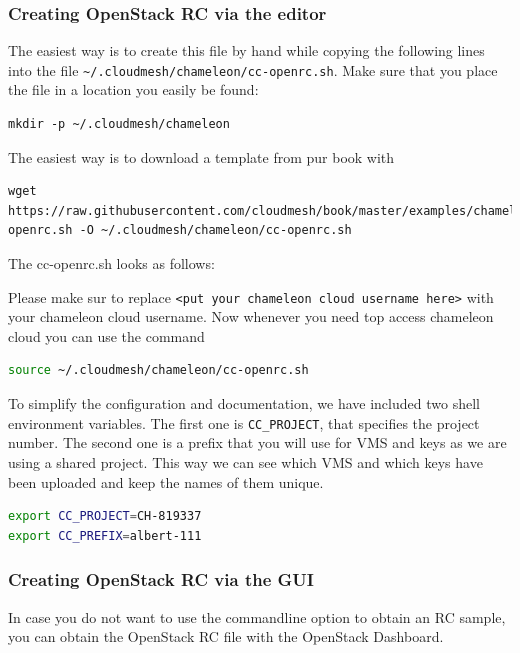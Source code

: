 \subsubsection{Creating OpenStack RC via the editor}

The easiest way is to create this file by hand while copying the
following lines into the file
\verb|~/.cloudmesh/chameleon/cc-openrc.sh|. Make sure that you place
the file in a location you easily be found:

\begin{lstlisting}
mkdir -p ~/.cloudmesh/chameleon
\end{lstlisting}

The easiest way is to download a template from pur book with 

\begin{lstlisting}
wget https://raw.githubusercontent.com/cloudmesh/book/master/examples/chameleon/cc-openrc.sh -O ~/.cloudmesh/chameleon/cc-openrc.sh
\end{lstlisting}

The cc-openrc.sh looks as follows:



Please make sur to replace
\verb|<put your chameleon cloud username here>| with your
chameleon cloud username. Now whenever you need top access chameleon
cloud you can use the command

\begin{lstlisting}[language=bash]
source ~/.cloudmesh/chameleon/cc-openrc.sh
\end{lstlisting}

To simplify the configuration and documentation, we have included two
shell environment variables. The first one is \verb|CC_PROJECT|, that
specifies the project number. The second one is a prefix that you will
use for VMS and keys as we are using a shared project. This way we can
see which VMS and which keys have been uploaded and keep the names of
them unique.

\begin{lstlisting}[language=bash]
export CC_PROJECT=CH-819337
export CC_PREFIX=albert-111
\end{lstlisting}

\subsubsection{Creating OpenStack RC via the GUI}

In case you do not want to use the commandline option to obtain an RC
sample, you can obtain the OpenStack RC file with the OpenStack
Dashboard.

